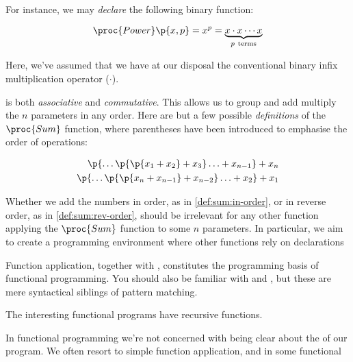 For instance, we may \emph{declare} the following binary function:

\begin{equation}
\proc{Power}\p{x,p}=x^p=\underbrace{x\cdot x\cdots x}_{p\ \text{terms}}
\end{equation}

Here, we've assumed that we have at our disposal the conventional binary infix
multiplication operator ($\cdot$).


is both \emph{associative} and \emph{commutative}. This allows
us to group and add multiply the $n$ parameters in any order. Here are but a few
possible \emph{definitions} of the $\proc{Sum}$ function, where parentheses
have been introduced to emphasise the order of operations:

\begin{align}
\p{\ldots\p{\p{x_1+x_2}+x_3}\ldots+x_{n-1}}+x_n\label{def:sum:in-order}\\
\p{\ldots\p{\p{x_n+x_{n-1}}+x_{n-2}}\ldots+x_2}+x_1\label{def:sum:rev-order}
\end{align}

Whether we add the numbers in order, as in \ref{def:sum:in-order}, or in reverse order, as in \ref{def:sum:rev-order}, should be irrelevant for any other function applying the $\proc{Sum}$ function to some $n$ parameters. In particular, we aim to create a programming environment where other functions rely on declarations 

Function application, together with ,
constitutes the programming basis of functional programming. You should also be
familiar with  and , but these are mere
syntactical siblings of pattern matching.

The interesting functional programs have recursive functions.

In functional programming we're not concerned with being clear about the  of our program. We often resort to simple function application, and in some functional 



